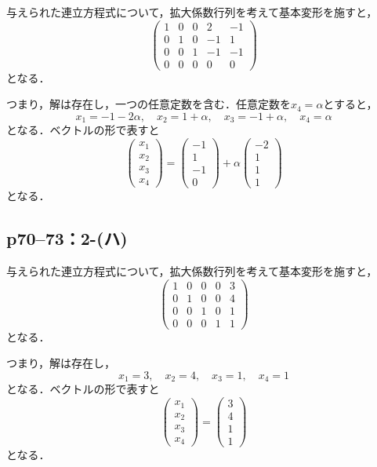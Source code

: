 \documentclass[a4paper,10pt,fleqn]{ltjsarticle}
\begin{document}
\begin{tleftbar}
  与えられた連立方程式について，拡大係数行列を考えて基本変形を施すと，
  \[
    \begin{pmatrix} 1 & 0 & 0  & 2 & -1 \\ 0 & 1& 0  & -1 & 1 \\ 0 & 0 & 1 & -1 & -1 \\ 0 & 0 & 0 & 0 & 0 \end{pmatrix}
  \]
  となる．

  つまり，解は存在し，一つの任意定数を含む．任意定数を$x_4 = \alpha$とすると，
  \[
    x_1 = -1 -2\alpha   , \quad x_2 =1+\alpha  , \quad x_3 =-1+ \alpha  , \quad x_4 = \alpha
  \]
  となる．ベクトルの形で表すと
  \[
    \begin{pmatrix} x_1 \\ x_2 \\ x_3 \\ x_4  \end{pmatrix}= \begin{pmatrix} -1 \\ 1 \\ -1 \\ 0 \end{pmatrix} +\alpha \begin{pmatrix} -2 \\ 1\\ 1 \\ 1\end{pmatrix}
  \]
  となる．
\end{tleftbar}

\newpage

\subsection*{p70--73：2-(ハ)}

\begin{tleftbar}
  与えられた連立方程式について，拡大係数行列を考えて基本変形を施すと，
  \[
    \begin{pmatrix} 1 & 0 & 0  & 0 & 3 \\ 0 & 1& 0  & 0 & 4 \\ 0 & 0 & 1 & 0 & 1 \\ 0 & 0 & 0 & 1 & 1 \end{pmatrix}
  \]
  となる．

  つまり，解は存在し，
  \[
    x_1 = 3 , \quad x_2 =4 , \quad x_3 = 1 , \quad x_4 = 1
  \]
  となる．ベクトルの形で表すと
  \[
    \begin{pmatrix} x_1 \\ x_2 \\ x_3 \\ x_4 \end{pmatrix}= \begin{pmatrix} 3 \\ 4 \\ 1 \\ 1 \end{pmatrix}
  \]
  となる．
\end{tleftbar}
\end{document}
